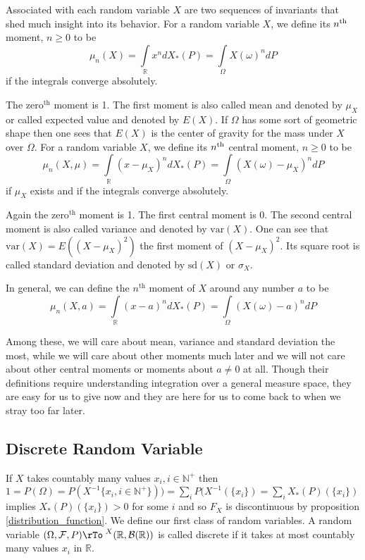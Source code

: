 \documentclass[12pt]{amsart}
\theoremstyle{definition}
\begin{document}
Associated with each random variable $X$ are two sequences of invariants that shed much insight into its behavior.
\dfn\label{n^thmoments} For a random variable $X$, we define its $n^{\textnormal{th}}$ moment, $n \geq 0$ to be
$$\mu_n(X) = \int\limits_{\mathbb{R}} x^n dX_*(P) = \int\limits_{\Omega} X(\omega)^n dP$$
if the integrals converge absolutely.

The $\text{zero}^{\text{th}}$ moment is 1. The first moment is also called mean and denoted by $\mu_X$ or called expected value and denoted by $E(X)$. If $\Omega$ has some sort of geometric shape then one sees that $E(X)$ is the center of gravity for the mass under $X$ over $\Omega$.
\dfn\label{nth_central_moments} For a random variable $X$, we define its $n^{\textnormal{th}}$ central moment, $n \geq 0$ to be
$$\mu_n(X, \mu) = \int\limits_{\mathbb{R}} (x - \mu_X)^n dX_*(P) = \int\limits_{\Omega} (X(\omega) - \mu_X)^n dP$$
if $\mu_X$ exists and if the integrals converge absolutely.

Again the $\text{zero}^{\text{th}}$ moment is 1. The first central moment is 0. The second central moment is also called variance and denoted by $\text{var}(X)$. One can see that $\text{var}(X) = E((X - \mu_X)^2)$ the first moment of $(X - \mu_X)^2$. Its square root is called standard deviation and denoted by $\text{sd}(X)$ or $\sigma_X$. 

In general, we can define the $n^{\text{th}}$ moment of $X$ around any number $a$ to be
$$\mu_n(X,a) = \int\limits_{\mathbb{R}} (x - a)^n dX_*(P) = \int\limits_{\Omega} (X(\omega) - a)^n dP$$

Among these, we will care about mean, variance and standard deviation the most, while we will care about other moments much later and we will not care about other central moments or moments about $a \neq 0$ at all. Though their definitions require understanding integration over a general measure space, they are easy for us to give now and they are here for us to come back to when we stray too far later.

\subsection{Discrete Random Variable} \label{discreterandomvariable} If $X$ takes countably many values $x_i, i \in \mathbb{N}^+$ then $1 = P(\Omega) = P(X^{-1}\{x_i, i \in \mathbb{N}^+\})) = \sum\limits_i P(X^{-1}(\{x_i\}) = \sum\limits_i X_*(P)(\{x_i\})$ implies $X_*(P)(\{x_i\}) > 0$ for some $i$ and so $F_X$ is discontinuous by proposition \ref{distribution_function}. We define our first class of random variables.
\dfn A random variable $(\Omega, \mathcal{F}, P) \rTo^{\,\, X} (\mathbb{R}, \mathcal{B}(\mathbb{R}))$ is called discrete if it takes at most countably many values $x_i$ in $\mathbb{R}$.
\end{document}
